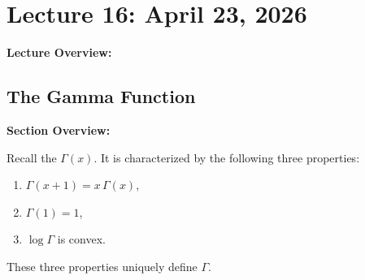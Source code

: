 \documentclass[../master/master.tex]{subfiles}
\begin{document}
\renewcommand{\lecturenum}{16}
\renewcommand{\lecturedate}{April 23, 2026}
\renewcommand{\lecturetopic}{The Gamma Function}

\section{Lecture \lecturenum : \lecturedate}

\begin{lecturesummary}
\textbf{Lecture Overview:}
\end{lecturesummary}

\subsection{The Gamma Function}

\begin{summarybox}
\textbf{Section Overview:}
\end{summarybox}

Recall the  $\Gamma(x)$. It is characterized by the following three properties:
\begin{enumerate}[label=(\roman*)]
    \item $\Gamma(x+1) = x\,\Gamma(x)$,
    \item $\Gamma(1) = 1$,
    \item $\log \Gamma$ is convex.
\end{enumerate}

\begin{theorem}
These three properties uniquely define $\Gamma$.
\end{theorem}
\end{document}
